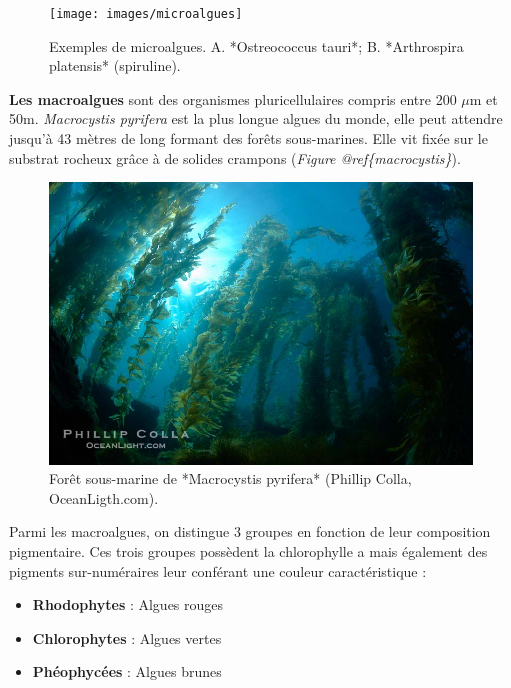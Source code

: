 \documentclass[
]{book}
\begin{document}
\begin{figure}

{\centering \texttt{[image: images/microalgues]} 

}

\caption{Exemples de microalgues. A. *Ostreococcus tauri*; B. *Arthrospira platensis* (spiruline).}\label{fig:microalgue}
\end{figure}

\textbf{Les macroalgues} sont des organismes pluricellulaires compris entre 200 \(\mu\)m et 50m. \emph{Macrocystis pyrifera} est la plus longue algues du monde, elle peut attendre jusqu'à 43 mètres de long formant des forêts sous-marines. Elle vit fixée sur le substrat rocheux grâce à de solides crampons (\emph{Figure @ref\{macrocystis\}}).

\begin{figure}

{\centering \includegraphics[width=10.94in]{images/macrocystis} 

}

\caption{Forêt sous-marine de *Macrocystis pyrifera* (Phillip Colla, OceanLigth.com).}\label{fig:macrocystis}
\end{figure}

Parmi les macroalgues, on distingue 3 groupes en fonction de leur composition pigmentaire. Ces trois groupes possèdent la chlorophylle a mais également des pigments sur-numéraires leur conférant une couleur caractéristique :

\begin{itemize}
\item
  \textbf{Rhodophytes} : Algues rouges
\item
  \textbf{Chlorophytes} : Algues vertes
\item
  \textbf{Phéophycées} : Algues brunes
\end{itemize}
\end{document}
